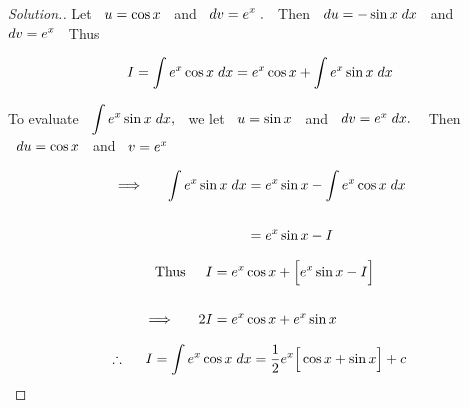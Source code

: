 \documentclass[11pt,a4paper]{article}
\theoremstyle{definition}
\newenvironment{solution}
  {\renewcommand{\qedsymbol}{}\begin{proof}[\textit{Solution}.]}
  {\end{proof}}
\begin{document}
\begin{solution}


Let $\hspace{0.2cm} u = \cos x\hspace{0.2cm} $ and $\hspace{0.2cm} dv  = \displaystyle{e^x\hspace{0.1cm}}.\hspace{0.2cm}$ Then $\hspace{0.2cm} du = -\sin x\hspace{0.1cm}dx\hspace{0.2cm}$ and $dv = \displaystyle{e^x}\hspace{0.2cm}$ Thus

$$I = \int e^x\cos x\hspace{0.1cm}dx = e^x\cos x + \int e^x \sin x \hspace{0.1cm}dx$$

To evaluate $\hspace{0.2cm}\displaystyle{\int e^x \sin x \hspace{0.1cm}dx},\hspace{0.2cm}$ we let $\hspace{0.2cm} u = \sin x \hspace{0.2cm}$ and $\hspace{0.2cm} dv = e^x \hspace{0.1cm}dx.\hspace{0.3cm}$ Then $\hspace{0.2cm} du = \cos x\hspace{0.2cm}$ and $\hspace{0.2cm} v = e^x$

\begin{align*}
\implies \hspace{0.5cm} \int e^x \sin x \hspace{0.1cm}dx & = e^x \sin x - \int e^x\cos x \hspace{0.1cm}dx\\\\
& = e^x\sin x - I
\end{align*}

\begin{align*}
\text{Thus}\hspace{0.5cm} I & = e^x\cos x  + \Big[e^x\sin x - I\Big]\\\\
\implies \hspace{0.5cm} 2I & = e^x\cos x + e^x\sin x\\
\end{align*}

$$\therefore\hspace{0.5cm} I = \int e^x\cos x\hspace{0.1cm}dx = \frac{1}{2}e^x\Big[\cos x + \sin x \Big] + c$$
\end{solution}
\end{document}
